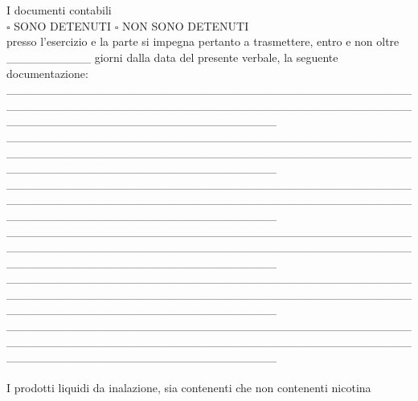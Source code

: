 \documentclass[12pt]{article}
\begin{document}
\\\\
I documenti contabili \\
\begin{math}\square\end{math} SONO DETENUTI \begin{math}\square\end{math} NON SONO DETENUTI\\
presso l’esercizio e la parte si impegna pertanto a trasmettere, entro e non oltre \_\_\_\_\_\_\_\_\_\_  giorni dalla data del presente verbale, la seguente documentazione: \\
\_\_\_\_\_\_\_\_\_\_\_\_\_\_\_\_\_\_\_\_\_\_\_\_\_\_\_\_\_\_\_\_\_\_\_\_\_\_\_\_\_\_\_\_\_\_\_\_\_\_\_\_\_\_\_\_\_\_\_\_\_\_\_\_\_\_\_\_\_\_\_\_\_\_\_\_\_\_\_\_\_\_\_\_\_\_\_\_\_\_\_\_\_\_\_\_\_\_\_\_\_\_\_\_\_\_\_\_\_\_\_\_\_\_\_\_\_\_\_\_\_\_\_\_\_\_\_\_ \\
\_\_\_\_\_\_\_\_\_\_\_\_\_\_\_\_\_\_\_\_\_\_\_\_\_\_\_\_\_\_\_\_\_\_\_\_\_\_\_\_\_\_\_\_\_\_\_\_\_\_\_\_\_\_\_\_\_\_\_\_\_\_\_\_\_\_\_\_\_\_\_\_\_\_\_\_\_\_\_\_\_\_\_\_\_\_\_\_\_\_\_\_\_\_\_\_\_\_\_\_\_\_\_\_\_\_\_\_\_\_\_\_\_\_\_\_\_\_\_\_\_\_\_\_\_\_\_\_ \\
\_\_\_\_\_\_\_\_\_\_\_\_\_\_\_\_\_\_\_\_\_\_\_\_\_\_\_\_\_\_\_\_\_\_\_\_\_\_\_\_\_\_\_\_\_\_\_\_\_\_\_\_\_\_\_\_\_\_\_\_\_\_\_\_\_\_\_\_\_\_\_\_\_\_\_\_\_\_\_\_\_\_\_\_\_\_\_\_\_\_\_\_\_\_\_\_\_\_\_\_\_\_\_\_\_\_\_\_\_\_\_\_\_\_\_\_\_\_\_\_\_\_\_\_\_\_\_\_ \\
\_\_\_\_\_\_\_\_\_\_\_\_\_\_\_\_\_\_\_\_\_\_\_\_\_\_\_\_\_\_\_\_\_\_\_\_\_\_\_\_\_\_\_\_\_\_\_\_\_\_\_\_\_\_\_\_\_\_\_\_\_\_\_\_\_\_\_\_\_\_\_\_\_\_\_\_\_\_\_\_\_\_\_\_\_\_\_\_\_\_\_\_\_\_\_\_\_\_\_\_\_\_\_\_\_\_\_\_\_\_\_\_\_\_\_\_\_\_\_\_\_\_\_\_\_\_\_\_ \\
\_\_\_\_\_\_\_\_\_\_\_\_\_\_\_\_\_\_\_\_\_\_\_\_\_\_\_\_\_\_\_\_\_\_\_\_\_\_\_\_\_\_\_\_\_\_\_\_\_\_\_\_\_\_\_\_\_\_\_\_\_\_\_\_\_\_\_\_\_\_\_\_\_\_\_\_\_\_\_\_\_\_\_\_\_\_\_\_\_\_\_\_\_\_\_\_\_\_\_\_\_\_\_\_\_\_\_\_\_\_\_\_\_\_\_\_\_\_\_\_\_\_\_\_\_\_\_\_ \\
\_\_\_\_\_\_\_\_\_\_\_\_\_\_\_\_\_\_\_\_\_\_\_\_\_\_\_\_\_\_\_\_\_\_\_\_\_\_\_\_\_\_\_\_\_\_\_\_\_\_\_\_\_\_\_\_\_\_\_\_\_\_\_\_\_\_\_\_\_\_\_\_\_\_\_\_\_\_\_\_\_\_\_\_\_\_\_\_\_\_\_\_\_\_\_\_\_\_\_\_\_\_\_\_\_\_\_\_\_\_\_\_\_\_\_\_\_\_\_\_\_\_\_\_\_\_\_\_ \\
\\
I prodotti liquidi da inalazione, sia contenenti che non contenenti nicotina \\
\end{document}
